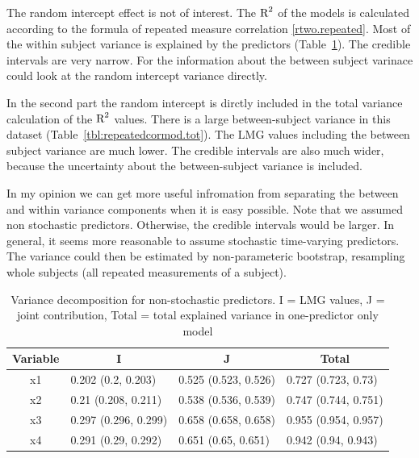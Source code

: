 \documentclass[11pt,a4paper,twoside]{book}\usepackage[]{graphicx}\usepackage[]{color}
\begin{document}
The random intercept effect is not of interest. The $\text{R}^2$ of the models is calculated according to the formula of repeated measure correlation \eqref{rtwo.repeated}.  Most of the within subject variance is explained by the predictors (Table~\ref{tbl:repeatedcormod}). The credible intervals are very narrow. For the information about the between subject varinace could look at the random intercept variance directly. 

In the second part the random intercept is dirctly included in the total variance calculation of the $\text{R}^2$ values. There is a large between-subject variance in this dataset (Table~\ref{tbl:repeatedcormod.tot}). The LMG values including the between subject variance are much lower. The credible intervals are also much wider, because the uncertainty about the between-subject variance is included. 

In my opinion we can get more useful infromation from separating the between and within variance components when it is easy possible. Note that we assumed non stochastic predictors. Otherwise, the credible intervals would be larger. In general, it seems more reasonable to assume stochastic time-varying predictors. The variance could then be estimated by non-parameteric bootstrap, resampling whole subjects (all repeated measurements of a subject).





\begin{table}[h]
\caption{Variance decomposition for non-stochastic predictors. I = LMG values, J = joint contribution, Total = total explained variance in one-predictor only model}
\centering
\begin{tabular}{clll}
  \toprule
  \multicolumn{1}{c}{\textbf{Variable}} & \multicolumn{1}{c}{\textbf{I}} &\multicolumn{1}{c}{\textbf{J}} & \multicolumn{1}{c}{\textbf{Total}} \\
  \hline
x1 & 0.202 (0.2, 0.203)  & 0.525 (0.523, 0.526)   & 0.727 (0.723, 0.73)  \\ 
x2 & 0.21 (0.208, 0.211)  & 0.538 (0.536, 0.539)   & 0.747 (0.744, 0.751)  \\ 
x3 & 0.297 (0.296, 0.299)  & 0.658 (0.658, 0.658)   & 0.955 (0.954, 0.957)  \\ 
x4 & 0.291 (0.29, 0.292)  & 0.651 (0.65, 0.651)   & 0.942 (0.94, 0.943)  \\ 
   \bottomrule
\end{tabular}
\label{tbl:repeatedcormod}
\end{table}
\end{document}

